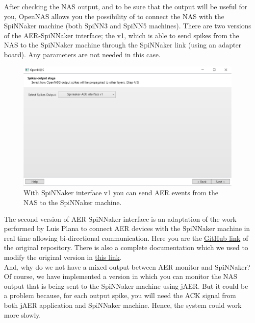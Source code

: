 After checking the NAS output, and to be sure that the output will be useful for you, OpenNAS allows you the possibility of to connect the NAS with the SpiNNaker machine (both SpiNN3 and SpiNN5 machines). There are two versions of the AER-SpiNNaker interface; the v1, which is able to send spikes from the NAS to the SpiNNaker machine through the SpiNNaker link (using an adapter board). Any parameters are not needed in this case.

\begin{figure}[H]
\centering
\includegraphics[width=1\textwidth]{images/Img23_S4_OutInterface_2.PNG}
\caption{\label{fig:OpenNAS_s4_spinnv1}With SpiNNaker interface v1 you can send AER events from the NAS to the SpiNNaker machine.}
\end{figure}

The second version of AER-SpiNNaker interface is an adaptation of the work performed by Luis Plana to connect AER devices with the SpiNNaker machine in real time allowing bi-directional communication. Here you are the \textcolor{blue}{\href{https://github.com/SpiNNakerManchester/spio}{GitHub link}} of the original repository. There is also a complete documentation which we used to modify the original version in \textcolor{blue}{\href{http://spinnakermanchester.github.io/docs/fpga_aer/}{this link}}.\\

And, why do we not have a mixed output between AER monitor and SpiNNaker? Of course, we have implemented a version in which you can monitor the NAS output that is being sent to the SpiNNaker machine using jAER. But it could be a problem because, for each output spike, you will need the ACK signal from both jAER application and SpiNNaker machine. Hence, the system could work more slowly.\\

